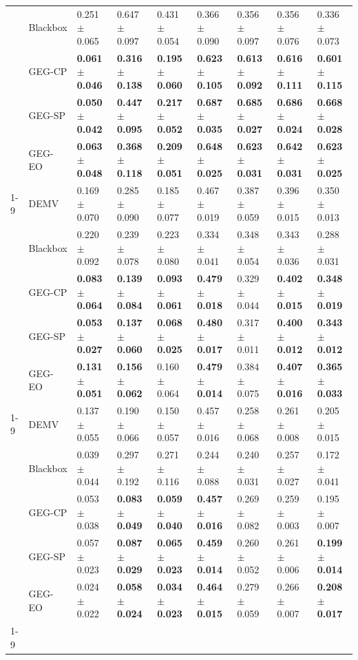 \begin{table}
\begin{tabular}{lllllllll}
 & Blackbox & 0.251 $\pm$ 0.065 & 0.647 $\pm$ 0.097 & 0.431 $\pm$ 0.054 & 0.366 $\pm$ 0.090 & 0.356 $\pm$ 0.097 & 0.356 $\pm$ 0.076 & 0.336 $\pm$ 0.073 \\
 & GEG-CP & \textbf{0.061 $\pm$ 0.046} & \textbf{0.316 $\pm$ 0.138} & \textbf{0.195 $\pm$ 0.060} & \textbf{0.623 $\pm$ 0.105} & \textbf{0.613 $\pm$ 0.092} & \textbf{0.616 $\pm$ 0.111} & \textbf{0.601 $\pm$ 0.115} \\
 & GEG-SP & \textbf{0.050 $\pm$ 0.042} & \textbf{0.447 $\pm$ 0.095} & \textbf{0.217 $\pm$ 0.052} & \textbf{0.687 $\pm$ 0.035} & \textbf{0.685 $\pm$ 0.027} & \textbf{0.686 $\pm$ 0.024} & \textbf{0.668 $\pm$ 0.028} \\
 & GEG-EO & \textbf{0.063 $\pm$ 0.048} & \textbf{0.368 $\pm$ 0.118} & \textbf{0.209 $\pm$ 0.051} & \textbf{0.648 $\pm$ 0.025} & \textbf{0.623 $\pm$ 0.031} & \textbf{0.642 $\pm$ 0.031} & \textbf{0.623 $\pm$ 0.025} \\
\cline{1-9}
\multirow[t]{5}{*}{park} & DEMV & 0.169 $\pm$ 0.070 & 0.285 $\pm$ 0.090 & 0.185 $\pm$ 0.077 & 0.467 $\pm$ 0.019 & 0.387 $\pm$ 0.059 & 0.396 $\pm$ 0.015 & 0.350 $\pm$ 0.013 \\
 & Blackbox & 0.220 $\pm$ 0.092 & 0.239 $\pm$ 0.078 & 0.223 $\pm$ 0.080 & 0.334 $\pm$ 0.041 & 0.348 $\pm$ 0.054 & 0.343 $\pm$ 0.036 & 0.288 $\pm$ 0.031 \\
 & GEG-CP & \textbf{0.083 $\pm$ 0.064} & \textbf{0.139 $\pm$ 0.084} & \textbf{0.093 $\pm$ 0.061} & \textbf{0.479 $\pm$ 0.018} & 0.329 $\pm$ 0.044 & \textbf{0.402 $\pm$ 0.015} & \textbf{0.348 $\pm$ 0.019} \\
 & GEG-SP & \textbf{0.053 $\pm$ 0.027} & \textbf{0.137 $\pm$ 0.060} & \textbf{0.068 $\pm$ 0.025} & \textbf{0.480 $\pm$ 0.017} & 0.317 $\pm$ 0.011 & \textbf{0.400 $\pm$ 0.012} & \textbf{0.343 $\pm$ 0.012} \\
 & GEG-EO & \textbf{0.131 $\pm$ 0.051} & \textbf{0.156 $\pm$ 0.062} & 0.160 $\pm$ 0.064 & \textbf{0.479 $\pm$ 0.014} & 0.384 $\pm$ 0.075 & \textbf{0.407 $\pm$ 0.016} & \textbf{0.365 $\pm$ 0.033} \\
\cline{1-9}
\multirow[t]{5}{*}{wine} & DEMV & 0.137 $\pm$ 0.055 & 0.190 $\pm$ 0.066 & 0.150 $\pm$ 0.057 & 0.457 $\pm$ 0.016 & 0.258 $\pm$ 0.068 & 0.261 $\pm$ 0.008 & 0.205 $\pm$ 0.015 \\
 & Blackbox & 0.039 $\pm$ 0.044 & 0.297 $\pm$ 0.192 & 0.271 $\pm$ 0.116 & 0.244 $\pm$ 0.088 & 0.240 $\pm$ 0.031 & 0.257 $\pm$ 0.027 & 0.172 $\pm$ 0.041 \\
 & GEG-CP & 0.053 $\pm$ 0.038 & \textbf{0.083 $\pm$ 0.049} & \textbf{0.059 $\pm$ 0.040} & \textbf{0.457 $\pm$ 0.016} & 0.269 $\pm$ 0.082 & 0.259 $\pm$ 0.003 & 0.195 $\pm$ 0.007 \\
 & GEG-SP & 0.057 $\pm$ 0.023 & \textbf{0.087 $\pm$ 0.029} & \textbf{0.065 $\pm$ 0.023} & \textbf{0.459 $\pm$ 0.014} & 0.260 $\pm$ 0.052 & 0.261 $\pm$ 0.006 & \textbf{0.199 $\pm$ 0.014} \\
 & GEG-EO & 0.024 $\pm$ 0.022 & \textbf{0.058 $\pm$ 0.024} & \textbf{0.034 $\pm$ 0.023} & \textbf{0.464 $\pm$ 0.015} & 0.279 $\pm$ 0.059 & 0.266 $\pm$ 0.007 & \textbf{0.208 $\pm$ 0.017} \\
\cline{1-9}
\bottomrule
\end{tabular}
\end{table}
